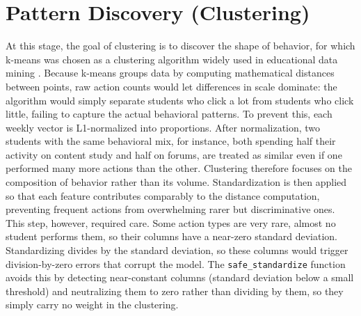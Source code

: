 \section{Pattern Discovery (Clustering)}
\label{sec:pattern-discovery}
%
%
%
At this stage, the goal of clustering is to discover the shape of behavior, for which k-means was chosen as a clustering algorithm widely used in educational data mining \cite{romero_edm_survey}. Because k-means groups data by computing mathematical distances between points, raw action counts would let differences in scale dominate: the algorithm would simply separate students who click a lot from students who click little, failing to capture the actual behavioral patterns. To prevent this, each weekly vector is L1-normalized into proportions. After normalization, two students with the same behavioral mix, for instance, both spending half their activity on content study and half on forums, are treated as similar even if one performed many more actions than the other. Clustering therefore focuses on the composition of behavior rather than its volume.
Standardization is then applied so that each feature contributes comparably to the distance computation, preventing frequent actions from overwhelming rarer but discriminative ones. This step, however, required care. Some action types are very rare, almost no student performs them, so their columns have a near-zero standard deviation. Standardizing divides by the standard deviation, so these columns would trigger division-by-zero errors that corrupt the model. The \texttt{safe\_standardize} function avoids this by detecting near-constant columns (standard deviation below a small threshold) and neutralizing them to zero rather than dividing by them, so they simply carry no weight in the clustering.
